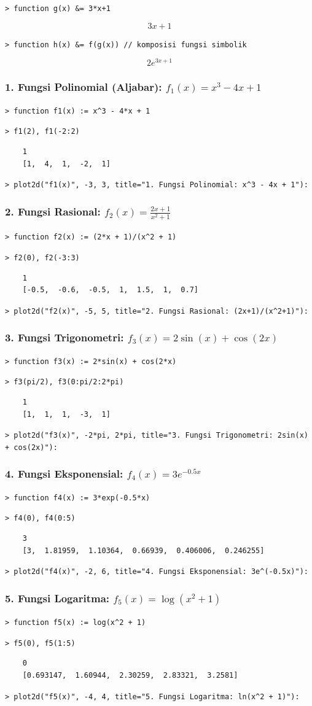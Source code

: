 \documentclass[11pt, a4paper]{article}
\newcommand{\emtcmd}[1]{\noindent\texttt{\textcolor{emtcommand}{>}\ #1}\par\smallskip}
\begin{document}
\emtcmd{function g(x) \&= 3*x+1}
$$3x + 1$$

\emtcmd{function h(x) \&= f(g(x)) \textcolor{emtcomment}{// komposisi fungsi simbolik}}
$$2 e^{3x + 1}$$

\subsubsection*{1. Fungsi Polinomial (Aljabar): $f_1(x) = x^3 - 4x + 1$}
\emtcmd{function f1(x) := x\^{}3 - 4*x + 1}
\emtcmd{f1(2), f1(-2:2)}
\begin{verbatim}
    1
    [1,  4,  1,  -2,  1]
\end{verbatim}
\emtcmd{plot2d("f1(x)", -3, 3, title="1. Fungsi Polinomial: x\^{}3 - 4x + 1"):}

\subsubsection*{2. Fungsi Rasional: $f_2(x) = \frac{2x + 1}{x^2 + 1}$}
\emtcmd{function f2(x) := (2*x + 1)/(x\^{}2 + 1)}
\emtcmd{f2(0), f2(-3:3)}
\begin{verbatim}
    1
    [-0.5,  -0.6,  -0.5,  1,  1.5,  1,  0.7]
\end{verbatim}
\emtcmd{plot2d("f2(x)", -5, 5, title="2. Fungsi Rasional: (2x+1)/(x\^{}2+1)"):}

\subsubsection*{3. Fungsi Trigonometri: $f_3(x) = 2\sin(x) + \cos(2x)$}
\emtcmd{function f3(x) := 2*sin(x) + cos(2*x)}
\emtcmd{f3(pi/2), f3(0:pi/2:2*pi)}
\begin{verbatim}
    1
    [1,  1,  1,  -3,  1]
\end{verbatim}
\emtcmd{plot2d("f3(x)", -2*pi, 2*pi, title="3. Fungsi Trigonometri: 2sin(x) + cos(2x)"):}

\subsubsection*{4. Fungsi Eksponensial: $f_4(x) = 3e^{-0.5x}$}
\emtcmd{function f4(x) := 3*exp(-0.5*x)}
\emtcmd{f4(0), f4(0:5)}
\begin{verbatim}
    3
    [3,  1.81959,  1.10364,  0.66939,  0.406006,  0.246255]
\end{verbatim}
\emtcmd{plot2d("f4(x)", -2, 6, title="4. Fungsi Eksponensial: 3e\^{}(-0.5x)"):}

\subsubsection*{5. Fungsi Logaritma: $f_5(x) = \log(x^2 + 1)$}
\emtcmd{function f5(x) := log(x\^{}2 + 1)}
\emtcmd{f5(0), f5(1:5)}
\begin{verbatim}
    0
    [0.693147,  1.60944,  2.30259,  2.83321,  3.2581]
\end{verbatim}
\emtcmd{plot2d("f5(x)", -4, 4, title="5. Fungsi Logaritma: ln(x\^{}2 + 1)"):}
\end{document}
